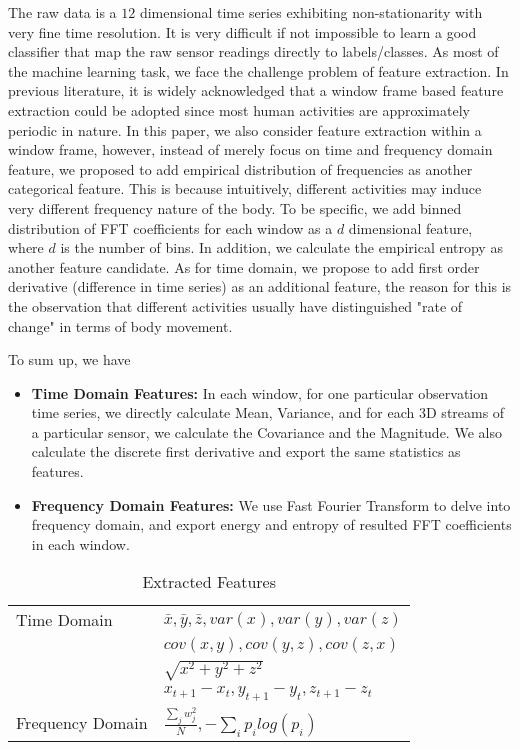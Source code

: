 The raw data is a $12$ dimensional time series exhibiting non-stationarity with very fine time resolution. It is very difficult if not impossible to learn a good classifier that map the raw sensor readings directly to labels/classes. As most of the machine learning task, we face the challenge problem of feature extraction. In previous literature, it is widely acknowledged that a window frame based feature extraction could be adopted since most human activities are approximately periodic in nature. In this paper, we also consider feature extraction within a window frame, however, instead of merely focus on time and frequency domain feature, we proposed to add empirical distribution of frequencies as another categorical  feature. This is because intuitively, different activities may induce very different frequency nature of the body. To be specific, we add binned distribution of FFT coefficients for each window as a $d$ dimensional feature, where $d$ is the number of bins. In addition, we calculate the empirical entropy as another feature candidate. As for time domain, we propose to add first order derivative (difference in time series) as an additional feature, the reason for this is the observation that different activities usually have distinguished "rate of change" in terms of body movement.

To sum up, we have
\begin{itemize}
\item \textbf{Time Domain Features:} In each window, for one particular observation time series, we directly calculate Mean, Variance, and for each 3D streams of a particular sensor, we calculate the Covariance and the Magnitude. We also calculate the discrete first derivative and export the same statistics as features. 
\item \textbf{Frequency Domain Features:} We use Fast Fourier Transform to delve into frequency domain, and export energy and entropy of resulted FFT coefficients in each window.
\end{itemize}

\begin{table}
\begin{center}
\begin{tabular}{|l|l|}
      \hline
      \hline
      Time Domain & $\bar{x},\bar{y},\bar{z},var(x),var(y),var(z)$\\
      &$cov(x,y),cov(y,z),cov(z,x)$\\
      &$\sqrt{x^2+y^2+z^2}$\\
      & $x_{t+1}-x_{t},y_{t+1}-y_{t},z_{t+1}-z_{t}$\\
  \hline
  Frequency Domain  & $\frac{\sum_j w_j^2}{N}, -\sum_i p_ilog(p_i)$  \\
  \hline
\end{tabular}
\end{center}
\caption{Extracted Features}
\end{table}

